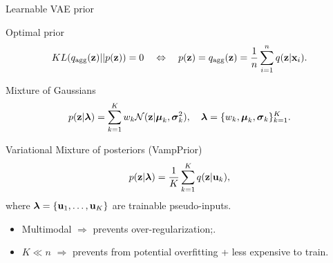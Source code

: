 \begin{frame}{Learnable VAE prior}
	\begin{block}{Optimal prior}
		\vspace{-0.7cm}
		\[
			KL(q_{\text{agg}}(\mathbf{z}) || p(\mathbf{z})) = 0 \quad \Leftrightarrow \quad p (\mathbf{z}) = q_{\text{agg}}(\mathbf{z}) = \frac{1}{n} \sum_{i=1}^n q(\mathbf{z} | \mathbf{x}_i).
		\]
		\vspace{-0.6cm}
	\end{block}
	\begin{block}{Mixture of Gaussians}
		\vspace{-0.3cm}
		\[
			p(\mathbf{z} | \boldsymbol{\lambda}) = \sum_{k=1}^K w_k \mathcal{N}(\mathbf{z} | \boldsymbol{\mu}_k, \boldsymbol{\sigma}_k^2), \quad \boldsymbol{\lambda} = \{w_k, \boldsymbol{\mu}_k, \boldsymbol{\sigma}_k\}_{k=1}^K.
		\]
		\vspace{-0.5cm}
	\end{block}
	\begin{block}{Variational Mixture of posteriors (VampPrior)}
		\vspace{-0.3cm}
		\[
		p(\mathbf{z} | \boldsymbol{\lambda}) = \frac{1}{K} \sum_{k=1}^K q(\mathbf{z} | \mathbf{u}_k),
		\]
		where $\boldsymbol{\lambda} = \{\mathbf{u}_1, \dots, \mathbf{u}_K\}$ are trainable pseudo-inputs.
	\end{block}
	\begin{itemize}
		\item Multimodal $\Rightarrow$ prevents over-regularization;.
		\item $K \ll n$ $\Rightarrow$ prevents from potential overfitting + less expensive to train.
	\end{itemize}
\end{frame}
